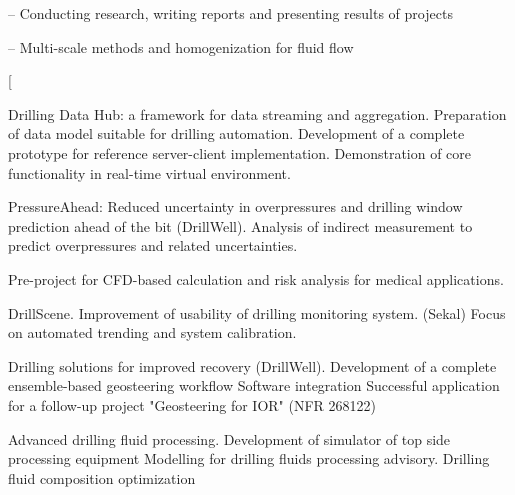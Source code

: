 {-- Conducting research, writing reports and presenting results of projects}

{-- Multi-scale methods and homogenization for fluid flow}

\ecvitemproj[
\begin{cvitemize}
% 
 \item Drilling Data Hub: a framework for data streaming and aggregation. \cite{suter2017rthub}
 \subitem Preparation of data  model suitable for drilling automation.
 \subitem Development of a complete prototype for reference server-client implementation.
 \subitem Demonstration of core functionality in real-time virtual environment. 
 \item PressureAhead: Reduced uncertainty in overpressures and drilling window prediction ahead of the bit (DrillWell). 
 \subitem Analysis of indirect measurement to predict overpressures and related uncertainties.
 \item Pre-project for CFD-based calculation and risk analysis for medical applications. \cite{alyaev2016elucidating}
 \item DrillScene. Improvement of usability of drilling monitoring system. (Sekal)
 \subitem Focus on automated trending and system calibration.
 \item Drilling solutions for improved recovery (DrillWell). \cite{luo2015ensemble}
 \subitem Development of a complete ensemble-based geosteering workflow
 \subitem Software integration
 \subitem Successful application for a follow-up project "Geosteering for IOR" (NFR 268122)
 \item Advanced drilling fluid processing. \cite{iversen2015towards}
 \subitem Development of simulator of top side processing equipment
 \subitem Modelling for drilling fluids processing advisory.
 \subitem Drilling fluid composition optimization
\end{cvitemize}
